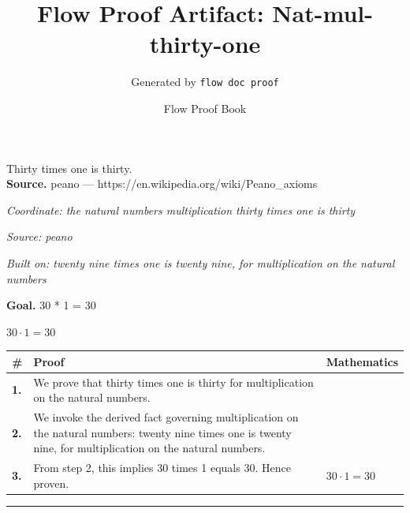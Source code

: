 \documentclass[11pt]{article}
\title{Flow Proof Artifact: Nat-mul-thirty-one}
\author{Generated by \texttt{flow doc proof}}
\date{Flow Proof Book}
\theoremstyle{definition}
\begin{document}
\maketitle
Thirty times one is thirty.\\[0.5em]
\textbf{Source.} peano — https://en.wikipedia.org/wiki/Peano\_axioms\\[0.5em]
\bigskip
{}\par
\smallskip\noindent\textit{Coordinate: the natural numbers \cdot multiplication \cdot thirty times one is thirty}\par
\smallskip\noindent\textit{Source: peano}\par
\smallskip\noindent\textit{Built on: twenty nine times one is twenty nine, for multiplication on the natural numbers}\par
\medskip
\noindent\textbf{Goal.} 30 * 1 = 30\par
\noindent$\displaystyle 30 \cdot 1 = 30$\par
\medskip
\noindent
\begin{tabular}{@{} >{\raggedright\arraybackslash}p{} >{\raggedright\arraybackslash}p{} >{\raggedleft\arraybackslash}p{} @{}}
\textbf{\#} & \textbf{Proof} & \textbf{Mathematics} \\
\midrule
\textbf{1.} & We prove that thirty times one is thirty for multiplication on the natural numbers. & \\[0.45em]
\textbf{2.} & We invoke the derived fact governing multiplication on the natural numbers: twenty nine times one is twenty nine, for multiplication on the natural numbers. & \\[0.45em]
\textbf{3.} & From step 2, this implies 30 times 1 equals 30. Hence proven. & $\displaystyle 30 \cdot 1 = 30$ \\[0.45em]
\bottomrule
\end{tabular}
\label{thm:Nat-multiplication-thirty_times_one_is_thirty}
\par\medskip\hrule
\end{document}
